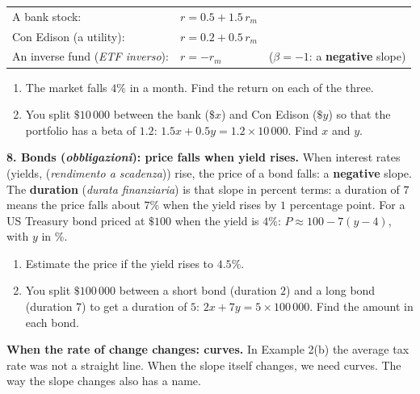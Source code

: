 \documentclass[12pt, twoside]{article}
\newcommand{\ita}[1]{(\emph{#1})}
\begin{document}
\begin{tabular}{@{}lll@{}}
  A bank stock: & $r = 0.5 + 1.5\,r_m$ & \\
  Con Edison (a utility): & $r = 0.2 + 0.5\,r_m$ & \\
  An inverse fund \ita{ETF inverso}: & $r = -r_m$ & ($\beta = -1$: a \textbf{negative} slope)
\end{tabular}

\begin{enumerate}[label=(\alph*), itemsep=0.1cm]
  \item The market falls $4\%$ in a month. Find the return on each of the
  three.
  \vspace{1.2cm}
  \item You split $\$10\,000$ between the bank ($\$x$) and Con Edison
  ($\$y$) so that the portfolio has a beta of $1.2$:
  $1.5x + 0.5y = 1.2 \times 10\,000$. Find $x$ and $y$.
  \vspace{1.6cm}
\end{enumerate}

\textbf{8. Bonds \ita{obbligazioni}: price falls when yield rises.} When
interest rates (yields, \ita{rendimento a scadenza}) rise, the price of a
bond falls: a \textbf{negative} slope. The \textbf{duration}
\ita{durata finanziaria} is that slope in percent terms: a duration of
$7$ means the price falls about $7\%$ when the yield rises by $1$
percentage point. For a US Treasury bond priced at $\$100$ when the yield
is $4\%$: $P \approx 100 - 7(y - 4)$, with $y$ in \%.

\begin{enumerate}[label=(\alph*), itemsep=0.1cm]
  \item Estimate the price if the yield rises to $4.5\%$.
  \vspace{0.9cm}
  \item You split $\$100\,000$ between a short bond (duration $2$) and a
  long bond (duration $7$) to get a duration of $5$:
  $2x + 7y = 5 \times 100\,000$. Find the amount in each bond.
  \vspace{1.4cm}
\end{enumerate}

\newpage

\textbf{When the rate of change changes: curves.} In Example 2(b) the
average tax rate was not a straight line. When the slope itself changes,
we need curves. The way the slope changes also has a name.
\end{document}
